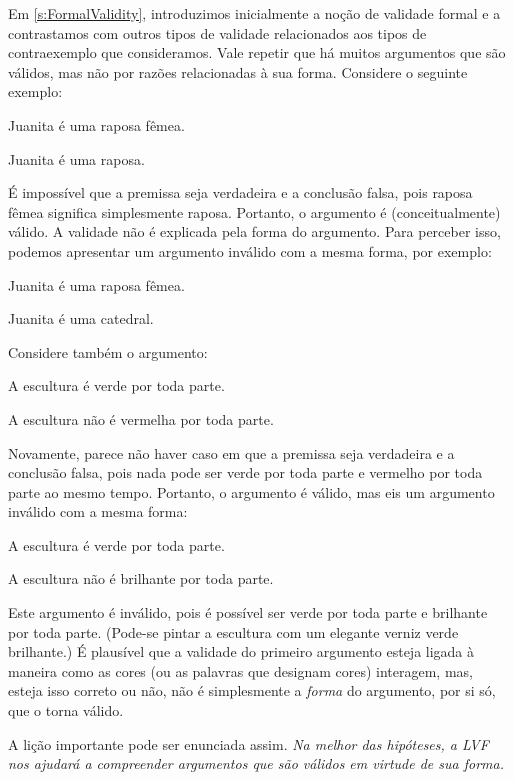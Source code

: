 Em \cref{s:FormalValidity}, introduzimos inicialmente a noção de
validade formal e a contrastamos com outros tipos de validade relacionados
aos tipos de contraexemplo que consideramos. Vale repetir que há muitos
argumentos que são válidos, mas não por razões relacionadas à sua forma.
Considere o seguinte exemplo:
	\begin{earg}
		\item[] Juanita é uma raposa fêmea.
		\item[\texttherefore] Juanita é uma raposa.
	\end{earg}
É impossível que a premissa seja verdadeira e a conclusão falsa, pois
raposa fêmea significa simplesmente raposa. Portanto, o argumento é
(conceitualmente) válido. A validade não é explicada pela forma do
argumento. Para perceber isso, podemos apresentar um argumento inválido
com a mesma forma, por exemplo:
	\begin{earg}
		\item[] Juanita é uma raposa fêmea.
		\item[\texttherefore] Juanita é uma catedral.
	\end{earg}
Considere também o argumento:
	\begin{earg}
		\item[] A escultura é verde por toda parte.
		\item[\texttherefore] A escultura não é vermelha por toda parte.
	\end{earg}
Novamente, parece não haver caso em que a premissa seja verdadeira e a
conclusão falsa, pois nada pode ser verde por toda parte e vermelho por
toda parte ao mesmo tempo. Portanto, o argumento é válido, mas eis um
argumento inválido com a mesma forma:
	\begin{earg}
		\item[] A escultura é verde por toda parte.
		\item[\texttherefore] A escultura não é brilhante por toda parte.
	\end{earg}
Este argumento é inválido, pois é possível ser verde por toda parte e
brilhante por toda parte. (Pode-se pintar a escultura com um elegante
verniz verde brilhante.) É plausível que a validade do primeiro argumento
esteja ligada à maneira como as cores (ou as palavras que designam cores)
interagem, mas, esteja isso correto ou não, não é simplesmente a
\emph{forma} do argumento, por si só, que o torna válido.

A lição importante pode ser enunciada assim. \emph{Na melhor das hipóteses, a LVF nos ajudará a compreender argumentos que são válidos em virtude de sua forma.}

